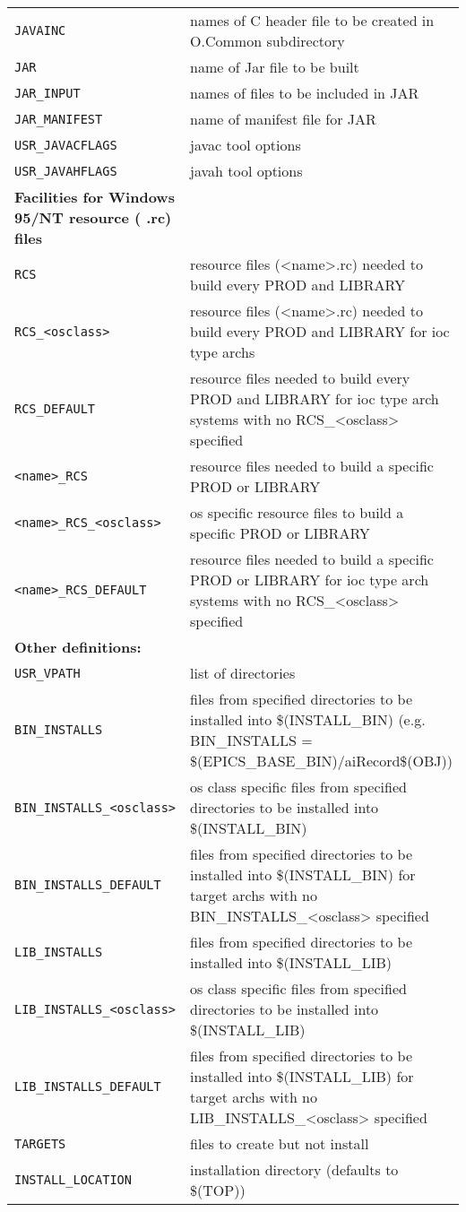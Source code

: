 \begin{center}
\begin{longtable}{p{2.94784in}p{3.76247in}}
\verb|JAVAINC| & names of C header file to be created in O.Common subdirectory\\
\verb|JAR| & name of Jar file to be built\\
\verb|JAR_INPUT| & names of files to be included in JAR\\
\verb|JAR_MANIFEST| & name of manifest file for JAR\\
\verb|USR_JAVACFLAGS| & javac tool options\\
\verb|USR_JAVAHFLAGS| & javah tool options\\
\textbf{Facilities for Windows 95/NT resource ( .rc) files} &    \\
\hline
\verb|RCS| & resource files (\textless{}name\textgreater{}.rc) needed to build every PROD and LIBRARY\\
\verb|RCS_<osclass>| & resource files (\textless{}name\textgreater{}.rc) needed to build every PROD and LIBRARY for ioc type archs\\
\verb|RCS_DEFAULT| & resource files needed to build every PROD and LIBRARY for ioc type arch systems with no RCS\_\textless{}osclass\textgreater{} specified\\
\verb|<name>_RCS| & resource files needed to build a specific PROD or LIBRARY\\
\verb|<name>_RCS_<osclass>| & os specific resource files to build a specific PROD or LIBRARY\\
\verb|<name>_RCS_DEFAULT| & resource files needed to build a specific PROD or LIBRARY for ioc type arch systems with no RCS\_\textless{}osclass\textgreater{} specified\\
\textbf{Other definitions: } &    \\
\hline
\verb|USR_VPATH| & list of directories\\
\verb|BIN_INSTALLS| & files from specified directories to be installed into \$(INSTALL\_BIN) (e.g. BIN\_INSTALLS = \$(EPICS\_BASE\_BIN)/aiRecord\$(OBJ))\\
\verb|BIN_INSTALLS_<osclass>| & os class specific files from specified directories to be installed into \$(INSTALL\_BIN)\\
\verb|BIN_INSTALLS_DEFAULT| & files from specified directories to be installed into \$(INSTALL\_BIN) for target archs with no BIN\_INSTALLS\_\textless{}osclass\textgreater{} specified\\
\verb|LIB_INSTALLS| & files from specified directories to be installed into \$(INSTALL\_LIB)\\
\verb|LIB_INSTALLS_<osclass>| & os class specific files from specified directories to be installed into \$(INSTALL\_LIB)\\
\verb|LIB_INSTALLS_DEFAULT| & files from specified directories to be installed into \$(INSTALL\_LIB) for target archs with no LIB\_INSTALLS\_\textless{}osclass\textgreater{} specified\\
\verb|TARGETS| & files to create but not install\\
\verb|INSTALL_LOCATION| & installation directory (defaults to \$(TOP))
\end{longtable}\end{center}


